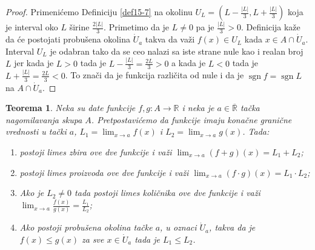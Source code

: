 \documentclass[a4paper,12pt]{article}
\theoremstyle{plain}
\newtheorem{theorem}{Teorema}[section]
\theoremstyle{definition}
\theoremstyle{remark}
\begin{document}
\begin{proof}
    Primenićemo Definiciju \ref{def15-7} na okolinu $\displaystyle U_L = \left(L - \frac{|L|}{3}, L + \frac{|L|}{3}\right)$ koja je interval oko $L$ širine $\displaystyle \frac{2|L|}{3}$. Primetimo da je $L \neq 0$ pa je $\displaystyle \frac{|L|}{3} > 0$. Definicija kaže da će postojati probušena okolina $\dot{U}_a$ takva da važi $f(x) \in U_L$ kada $x \in A \cap \dot{U}_a$. Interval $U_L$ je odabran tako da se ceo nalazi sa iste strane nule kao i realan broj $L$ jer kada je $L > 0$ tada je $\displaystyle L - \frac{|L|}{3} = \frac{2L}{3} > 0$ a kada je $L < 0$ tada je $\displaystyle L + \frac{|L|}{3} = \frac{2L}{3} < 0$. To znači da je funkcija različita od nule i da je $\operatorname{sgn} f = \operatorname{sgn} L$ na $A \cap \dot{U}_a$.
\end{proof}
\newpage
\begin{theorem}
    Neka su date funkcije $f, g : A \to \mathbb{R}$ i neka je $a \in \overline{\mathbb{R}}$ tačka nagomilavanja skupa $A$. Pretpostavićemo da funkcije imaju konačne granične vrednosti u tački $a$, $\displaystyle L_1 = \lim_{x \to a} f(x)$ i $\displaystyle L_2 = \lim_{x \to a} g(x)$. Tada:
    \begin{enumerate}[label=\alph*)]
        \item postoji limes zbira ove dve funkcije i važi $\displaystyle \lim_{x \to a} (f + g)(x) = L_1 + L_2$;
        \item postoji limes proizvoda ove dve funkcije i važi $\displaystyle \lim_{x \to a} (f \cdot g)(x) = L_1 \cdot L_2$;
        \item Ako je $L_2 \neq 0$ tada postoji limes količnika ove dve funkcije i važi $\displaystyle \lim_{x \to a} \frac{f(x)}{g(x)} = \frac{L_1}{L_2}$;
        \item Ako postoji probušena okolina tačke $a$, u oznaci $\dot{U}_a$, takva da je $f(x) \le g(x)$ za sve $x \in \dot{U}_a$ tada je $L_1 \le L_2$.
    \end{enumerate}
\end{theorem}
\end{document}
